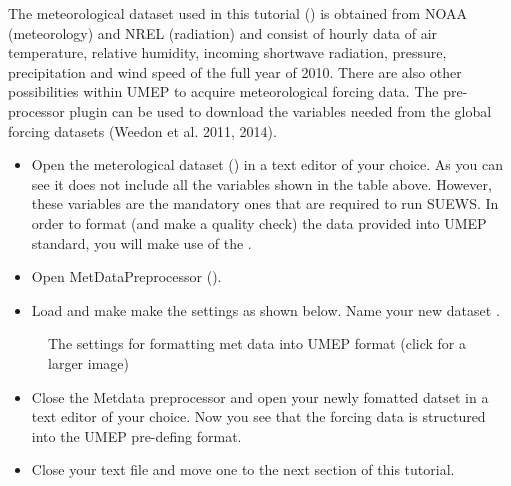 \documentclass[letterpaper,10pt,english]{sphinxmanual}
\begin{document}
The meteorological dataset used in this tutorial () is obtained from NOAA (meteorology) and NREL (radiation) and consist of  hourly data of air temperature, relative humidity, incoming shortwave radiation, pressure, precipitation and wind speed of the full year of 2010. There are also other possibilities within UMEP to acquire meteorological forcing data. The pre-processor plugin {\hyperref[\detokenize{pre-processor/Meteorological Data Download data (WATCH):watch}]{}} can be used to download the variables needed from the global  forcing datasets (Weedon et al. 2011, 2014).
\begin{itemize}
\item {} 
Open the meterological dataset () in a text editor of your choice. As you can see it does not include all the variables shown in the table above. However, these variables are the mandatory ones that are required to run SUEWS. In order to format (and make a quality check) the data provided into UMEP standard, you will make use of the {\hyperref[\detokenize{pre-processor/Meteorological Data MetPreprocessor:metpreprocessor}]{}}.

\item {} 
Open MetDataPreprocessor ().

\item {} 
Load  and make make the settings as shown below. Name your new dataset .

\end{itemize}

\begin{figure}[htbp]
\centering
\capstart

\noindent{}
\caption{The settings for formatting met data into UMEP format (click for a larger image)}\label{\detokenize{Tutorials/SuewsSpatial:id9}}\end{figure}
\begin{itemize}
\item {} 
Close the Metdata preprocessor and open your newly fomatted datset in a text editor of your choice. Now you see that the forcing data is structured into the UMEP pre-defing format.

\item {} 
Close your text file and move one to the next section of this tutorial.

\end{itemize}
\end{document}
